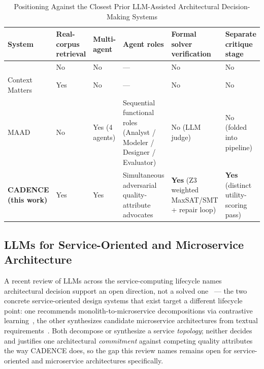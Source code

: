 \documentclass[preprint,12pt,authoryear]{elsarticle}
\renewcommand{\_}{\textunderscore\allowbreak{}}
\begin{document}
\begin{table}[!htbp]
\caption{Positioning Against the Closest Prior LLM-Assisted Architectural Decision-Making Systems\label{tab:relatedwork}}
\centering
\footnotesize
\setlength{\tabcolsep}{3pt}
\begin{tabular}{@{}
  >{\raggedright\arraybackslash}p{0.85in}
  >{\centering\arraybackslash}p{0.5in}
  >{\centering\arraybackslash}p{0.5in}
  >{\raggedright\arraybackslash}p{1.25in}
  >{\raggedright\arraybackslash}p{1.0in}
  >{\raggedright\arraybackslash}p{0.9in}
@{}}
\toprule
System & Real-corpus retrieval & Multi-agent & Agent roles & Formal solver verification & Separate critique stage \\
\midrule
\citet{dhar2024llm}            & No  & No             & ---                                                                    & No             & No \\
Context Matters~\citep{contextmatters2026} & Yes & No             & ---                                                                    & No             & No \\
MAAD~\citep{maad2025}                      & No  & Yes (4 agents) & Sequential functional roles (Analyst / Modeler / Designer / Evaluator) & No (LLM judge) & No (folded into pipeline) \\
\textbf{CADENCE (this work)}              & Yes & Yes            & Simultaneous adversarial quality-attribute advocates                  & \textbf{Yes} (Z3 weighted MaxSAT/SMT + repair loop) & \textbf{Yes} (distinct utility-scoring pass) \\
\bottomrule
\end{tabular}
\end{table}
\FloatBarrier

\subsection{LLMs for Service-Oriented and Microservice Architecture}

A recent review of LLMs across the service-computing lifecycle names architectural decision support an open direction, not a solved one~\citep{kumara2026llm4soc} --- the two concrete service-oriented design systems that exist target a different lifecycle point: one recommends monolith-to-microservice decompositions via contrastive learning~\citep{sellami2025microservice}, the other synthesizes candidate microservice architectures from textual requirements~\citep{albuquerque2026microservice}. Both decompose or synthesize a service \emph{topology}; neither decides and justifies one architectural \emph{commitment} against competing quality attributes the way CADENCE does, so the gap this review names remains open for service-oriented and microservice architectures specifically.
\end{document}
